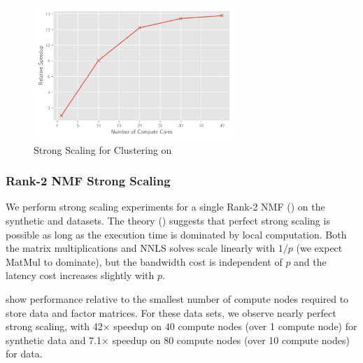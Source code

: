 \begin{figure}
\begin{center}
\includegraphics[height=2in, width=\columnwidth]{plots/dc_hierarchical_speedup.pdf}
\caption{Strong Scaling for Clustering on \hyper{}}
\label{fig:dcspeedup}
\end{center}
\end{figure}


\subsubsection{Rank-2 NMF Strong Scaling}

We perform strong scaling experiments for a single Rank-2 NMF () on the synthetic and \image{} datasets.
The theory () suggests that perfect strong scaling is possible as long as the execution time is dominated by local computation.
Both the matrix multiplications and NNLS solves scale linearly with $1/p$ (we expect MatMul to dominate), but the bandwidth cost is independent of $p$ and the latency cost increases slightly with $p$.

 show performance relative to the smallest number of compute nodes required to store data and factor matrices.
For these data sets, we observe nearly perfect strong scaling, with 42$\times$ speedup on 40 compute nodes (over 1 compute node) for synthetic data and 7.1$\times$ speedup on 80 compute nodes (over 10 compute nodes) for \image{} data.

